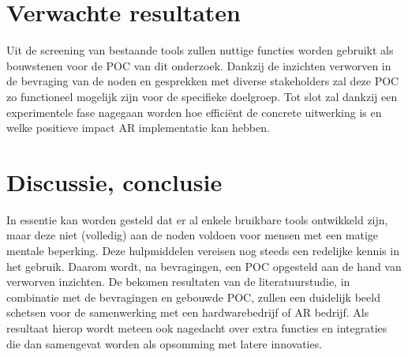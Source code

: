 \documentclass{hogent-article}
\begin{document}
    \section{Verwachte resultaten}%
    \label{sec:verwachte-resultaten}
    
    Uit de screening van bestaande tools zullen nuttige functies worden gebruikt als bouwstenen voor de POC van dit onderzoek. Dankzij de inzichten verworven in de bevraging van de noden en gesprekken met diverse stakeholders zal deze POC zo functioneel mogelijk zijn voor de specifieke doelgroep. Tot slot zal dankzij een experimentele fase nagegaan worden hoe efficiënt de concrete uitwerking is en welke positieve impact AR implementatie kan hebben.
    
    
    \section{Discussie, conclusie}%
    \label{sec:discussie-conclusie}
    In essentie kan worden gesteld dat er al enkele bruikbare tools ontwikkeld zijn, maar deze niet (volledig) aan de noden voldoen voor mensen met een matige mentale beperking. Deze hulpmiddelen vereisen nog steeds een redelijke kennis in het gebruik. Daarom wordt, na bevragingen, een POC opgesteld aan de hand van verworven inzichten. De bekomen resultaten van de literatuurstudie, in combinatie met de bevragingen en gebouwde POC, zullen een duidelijk beeld schetsen voor de samenwerking met een hardwarebedrijf of AR bedrijf. Als resultaat hierop wordt meteen ook nagedacht over extra functies en integraties die dan samengevat worden als opsomming met latere innovaties.

    
\end{document}
